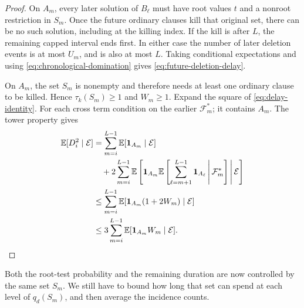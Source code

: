 \begin{proof}
On \(A_m\), every later solution of \(B_\ell\) must have root values
\(t\) and a nonroot restriction in \(S_m\).  Once the future ordinary
clauses kill that original set, there can be no such solution, including
at the killing index.  If the kill is after \(L\), the remaining capped
interval ends first.  In either case the number of later deletion
events is at most \(U_m\), and is also at most \(L\).
Taking conditional expectations and using
\eqref{eq:chronological-domination} gives
\eqref{eq:future-deletion-delay}.

On \(A_m\), the set \(S_m\) is nonempty and therefore needs at least
one ordinary clause to be killed.  Hence \(\tau_k(S_m)\ge1\) and
\(W_m\ge1\).  Expand the square of \eqref{eq:delay-identity}.
For each cross term condition on the earlier \(\mathcal F_m^*\);
it contains \(A_m\).  The tower property gives
\begin{align*}
 \mathbb E[D_i^2\mid\mathcal E]
 &=\sum_{m=i}^{L-1}\mathbb E[\mathbf1_{A_m}\mid\mathcal E]\\
 &\quad+2\sum_{m=i}^{L-1}
  \mathbb E\left[\mathbf1_{A_m}
   \mathbb E\left[\sum_{\ell=m+1}^{L-1}\mathbf1_{A_\ell}
             \,\middle|\,\mathcal F_m^*\right]
             \,\middle|\,\mathcal E\right]\\
 &\le\sum_{m=i}^{L-1}
        \mathbb E[\mathbf1_{A_m}(1+2W_m)\mid\mathcal E]\\
 &\le3\sum_{m=i}^{L-1}
        \mathbb E[\mathbf1_{A_m}W_m\mid\mathcal E].\qedhere
\end{align*}
\end{proof}

Both the root-test probability and the remaining duration are now
controlled by the same set \(S_m\).  We still have to bound how long
that set can spend at each level of \(q_d(S_m)\), and then average the
incidence counts.

